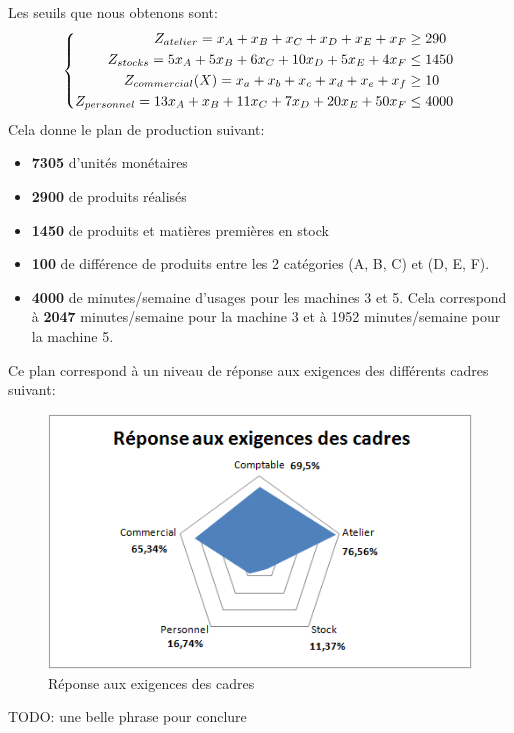 \documentclass[12pt]{article}
\begin{document}
Les seuils que nous obtenons sont:
\begin{equation*}
\left\{
\begin{aligned}
   Z_{atelier}= x_{A} + x_{B} + x_{C} + x_{D} + x_{E} + x_{F} &\geq290 
    \\
   Z_{stocks}= 5x_{A} + 5x_{B} + 6x_{C} + 10x_{D} + 5x_{E} + 4x_{F}
   &\leq1450 
   \\
   Z_{commercial}(X)=x_{a} + x_{b} + x_{c} + x_{d} + x_{e} + x_{f} &\geq 10
   \\
   Z_{personnel}= 13x_{A} + x_{B} + 11x_{C} + 7x_{D} + 20x_{E} + 50x_{F}&\leq 4000
\end{aligned}
\right.
\\
\\
\end{equation*}
Cela donne le plan de production suivant:
\begin{itemize}
\item \textbf{7305} d'unités monétaires
\item  \textbf{2900} de produits réalisés
\item \textbf{1450} de produits et matières premières en stock
\item \textbf{100} de différence de produits entre les 2 catégories (A, B, C) et (D, E, F).
\item \textbf{4000} de minutes/semaine d'usages pour les machines 3 et 5. Cela correspond à \textbf{2047} minutes/semaine pour la machine 3 et à 1952 minutes/semaine pour la machine 5.
\end{itemize}
Ce plan correspond à un niveau de réponse aux exigences des différents cadres suivant:
\begin{figure}[H]
    \begin{center}
        \includegraphics[scale=0.8]{plots_partie2/plot_radar.png}
        \caption{
            \label{fig} Réponse aux exigences des cadres
        }
    \end{center}
\end{figure}
TODO: une belle phrase pour conclure 
\end{document}
